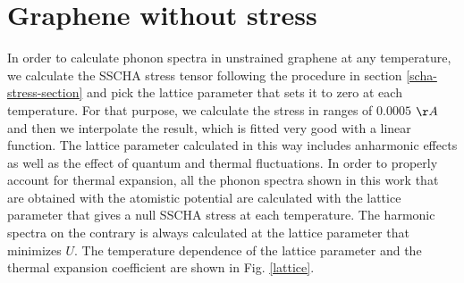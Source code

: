 \section{Graphene without stress}

In order to calculate phonon spectra in unstrained graphene at any temperature, we calculate the SSCHA stress tensor 
following the procedure in section \ref{scha-stress-section} and pick the lattice parameter that sets it to zero at 
each temperature. For that purpose, we calculate the stress in ranges of $0.0005$ $\AA$ and then we interpolate the 
result, which is fitted very good with a linear function. The lattice parameter calculated in this way includes 
anharmonic effects as well as the effect of quantum and thermal fluctuations. In order to properly account for 
thermal expansion, all the phonon spectra shown in this work that are obtained with the atomistic potential are 
calculated with the lattice parameter that gives a null SSCHA stress at each temperature. The harmonic spectra on the 
contrary is always calculated at the lattice parameter that minimizes $U$. The temperature dependence of the lattice 
parameter and the thermal expansion coefficient are shown in Fig. \ref{lattice}.
